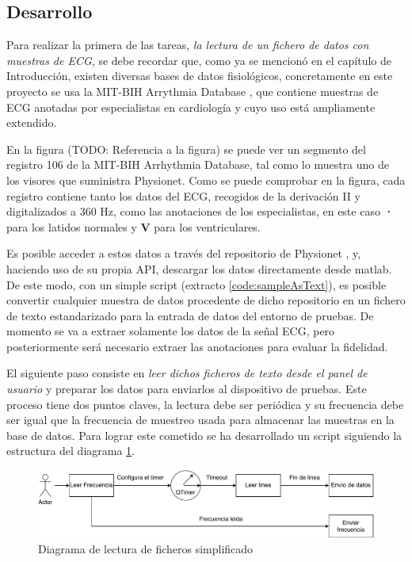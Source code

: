     \subsection{Desarrollo}

        Para realizar la primera de las tareas, \textit{la lectura de un fichero de datos con muestras de ECG}, se debe recordar que, como ya se mencionó en el capítulo de Introducción, existen diversas bases de datos fisiológicos, concretamente en este proyecto se usa la MIT-BIH Arrythmia Database \cite{MIT-BIH}, que contiene  muestras de ECG anotadas por especialistas en cardiología y cuyo uso está ampliamente extendido. 
        
        En la figura (TODO: Referencia a la figura) se puede ver un segmento del registro 106  de la MIT-BIH Arrhythmia Database\cite{MIT-BIH}, tal como lo muestra uno de los visores que suministra Physionet\cite{phisionet}. Como se puede comprobar en la figura, cada registro contiene tanto los datos del ECG, recogidos de la derivación II y digitalizados a 360 Hz, como las anotaciones de los especialistas, en este caso \textbf{·} para los latidos normales y \textbf{V} para los ventriculares.
        
        Es posible acceder a estos datos a través del repositorio de Physionet \cite{phisionet}, y, haciendo uso de su propia API, descargar los datos directamente desde matlab. De este modo, con un simple script (extracto \ref{code:sampleAsText}), es posible convertir cualquier muestra de datos procedente de dicho repositorio en un fichero de texto estandarizado para la entrada de datos del entorno de pruebas. De momento se va a extraer solamente los datos de la señal ECG, pero posteriormente será necesario extraer las anotaciones para evaluar la fidelidad.
        

        El siguiente paso consiste en \textit{leer dichos ficheros de texto desde el panel de usuario} y preparar los datos para enviarlos al dispositivo de pruebas. Este proceso tiene dos puntos claves, la lectura debe ser periódica y su frecuencia debe ser igual que la frecuencia de muestreo usada para almacenar las muestras en la base de datos. Para lograr este cometido se ha desarrollado un script siguiendo la estructura del diagrama \ref{fig:SimpleFileRead}. 

        \begin{figure}[H]  
                \centering
                        \includegraphics[width =\linewidth]{figuras/SimpleFileRead.pdf}
                \caption{Diagrama de lectura de ficheros simplificado}
                \label{fig:SimpleFileRead}
        \end{figure}

